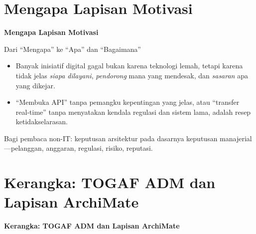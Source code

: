 \documentclass[aspectratio=169, table]{beamer}
\newcommand{\sectionframe}[1]{%
  \begin{frame}{\hfill}
    \centering
    \Huge{\textbf{#1}}
  \end{frame}
}
\newcommand{\takeaway}[1]{%
  \vspace{4pt}
  {\footnotesize #1}
}
\begin{document}
\section{Mengapa Lapisan Motivasi}
\sectionframe{Mengapa Lapisan Motivasi}

\begin{frame}{Dari ``Mengapa'' ke ``Apa'' dan ``Bagaimana''}
  \vspace{6pt}
  \begin{itemize}
    \item Banyak inisiatif digital gagal bukan karena teknologi lemah, tetapi
          karena tidak jelas \emph{siapa dilayani}, \emph{pendorong} mana yang
          mendesak, dan \emph{sasaran} apa yang dikejar.
    \item ``Membuka API'' tanpa pemangku kepentingan yang jelas, atau
          ``transfer real-time'' tanpa menyatakan kendala regulasi dan sistem
          lama, adalah resep ketidakselarasan.
  \end{itemize}
  \takeaway{Bagi pembaca non-IT: keputusan arsitektur pada dasarnya keputusan
  manajerial---pelanggan, anggaran, regulasi, risiko, reputasi.}
\end{frame}

\section{Kerangka: TOGAF ADM dan Lapisan ArchiMate}
\sectionframe{Kerangka: TOGAF ADM dan Lapisan ArchiMate}
\end{document}
